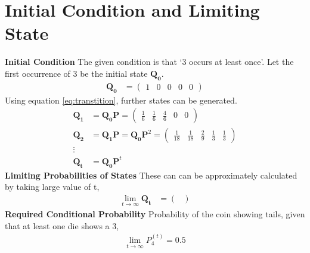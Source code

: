 \documentclass[journal,12pt,two column]{IEEEtran}
\providecommand{\prt}[2]{\ensuremath{P_{#1}^{\left(#2\right)} }}        %
\theoremstyle{remark}
\newcommand{\myvec}[1]{\ensuremath{\begin{pmatrix}#1\end{pmatrix}}}
\let\vec\mathbf
\begin{document}
\section{Initial Condition and Limiting State}
\textbf{Initial Condition}
     The given condition is that \lq3 occurs at least once\rq. Let the first occurrence of 3 be the initial state $ \vec{Q_0}$.
    \begin{align}
        \vec{Q_0} &= \myvec{1 & 0 & 0 & 0 & 0} 
    \end{align}
    Using equation \eqref{eq:transtition}, further states can be generated.
    \begin{align}
        \vec{Q_1} &= \vec{Q_{0}} \vec{P}
            = \myvec{\frac{1}{6} & \frac{1}{6} & \frac{4}{6} & 0 & 0}\\
        \vec{Q_2} &=  \vec{Q_1} \vec{P} =\vec{Q_0} \vec{P}^{2}
            = \myvec{\frac{1}{18} & \frac{1}{18} & \frac{2}{9} & \frac{1}{3} & \frac{1}{3}}\\   
        \vdots \\
        \vec{Q_t} &= \vec{Q_0} \vec{P}^{t}  
    \end{align}
\textbf{Limiting Probabilities of States}
    These can can be approximately calculated by taking large value of t,
    \begin{align}
       \lim_{t \to \infty}  \vec{Q_t} &= 
       \myvec{} 
    \end{align}
\textbf{Required Conditional Probability}
    Probability of the coin showing tails, given that at least one die shows a 3,
    \begin{align}
       \lim_{t \to \infty} \prt{4}{t} = 0.5
    \end{align}
    
\end{document}

